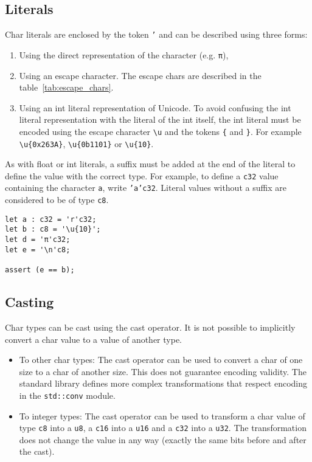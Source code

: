 \subsection{Literals}
\label{sec:org73c4919}

Char literals are enclosed by the token \texttt{'} and can be described using three forms:

\begin{enumerate}
\item Using the direct representation of the character (e.g. \texttt{π}),
\item Using an escape character. The escape chars are described in the
  table~\ref{tab:escape_chars}.

\item Using an int literal representation of Unicode. To avoid confusing the int
  literal representation with the literal of the int itself, the int literal
  must be encoded using the escape character \texttt{\textbackslash{}u} and the
  tokens \texttt{\{} and \texttt{\}}. For example
  \texttt{\textbackslash{}u\{0x263A\}}, \texttt{\textbackslash{}u\{0b1101\}} or
  \texttt{\textbackslash{}u\{10\}}.

\end{enumerate}

As with float or int literals, a suffix must be added at the end of the literal
to define the value with the correct type. For example, to define a \texttt{c32}
value containing the character \texttt{a}, write \texttt{'a'c32}. Literal values
without a suffix are considered to be of type \texttt{c8}.

\begin{lstlisting}[style=coloredverbatim]
let a : c32 = 'r'c32;
let b : c8 = '\u{10}';
let d = 'π'c32;
let e = '\n'c8;

assert (e == b);
\end{lstlisting}

\subsection{Casting}
\label{sec:org16d703f}

Char types can be cast using the cast operator. It is not possible to implicitly convert a char value to a value of another type.

\begin{itemize}
\item To other char types: The cast operator can be used to convert a char of
  one size to a char of another size. This does not guarantee encoding validity.
  The standard library defines more complex transformations that respect
  encoding in the \texttt{std::conv} module.

\item To integer types: The cast operator can be used to transform a char value
  of type \texttt{c8} into a \texttt{u8}, a \texttt{c16} into a \texttt{u16} and
  a \texttt{c32} into a \texttt{u32}. The transformation does not change the
  value in any way (exactly the same bits before and after the cast).

\end{itemize}


